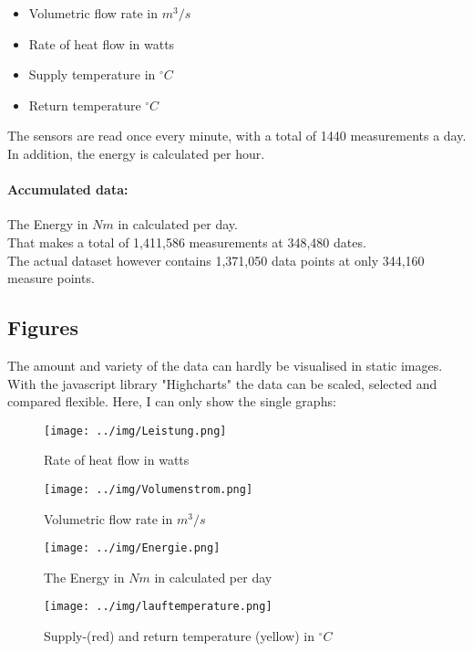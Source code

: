 \documentclass{scrartcl}
\begin{document}
\begin{itemize}
\item Volumetric flow rate in $m^3 / s$
\item Rate of heat flow in watts
\item Supply temperature in $^\circ C$
\item Return temperature $^\circ C$
\end{itemize}

The sensors are read once every minute, with a total of 1440 measurements a day. In addition, the energy is calculated per hour.\\

\paragraph{Accumulated data:}
The Energy in $Nm$ in calculated per day.\\

\noindent
That makes a total of 1,411,586 measurements at 348,480 dates.\\
The actual dataset however contains 1,371,050 data points at only 344,160 measure points.

\subsection{Figures}
The amount and variety of the data can hardly be visualised in static images. With the javascript library "Highcharts" the data can be scaled, selected and compared flexible. Here, I can only show the single graphs:

\begin{figure}[H]
  \centering
  \texttt{[image: ../img/Leistung.png]}
  \caption{Rate of heat flow in watts}
\end{figure}

\begin{figure}[H]
  \centering
  \texttt{[image: ../img/Volumenstrom.png]}
  \caption{Volumetric flow rate in $m^3 / s$}
\end{figure}


\begin{figure}[H]
  \centering
  \texttt{[image: ../img/Energie.png]}
  \caption{The Energy in $Nm$ in calculated per day}
\end{figure}

\begin{figure}[H]
  \centering
  \texttt{[image: ../img/lauftemperature.png]}
  \caption{Supply-(red) and return temperature (yellow) in $^\circ C$}
\end{figure}
\end{document}
